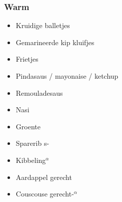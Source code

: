 \subsubsection*{Warm}
\begin{itemize}
	\item	Kruidige balletjes
	\item	Gemarineerde kip kluifjes
	\item	Frietjes
	\item	Pindasaus / mayonaise / ketchup
	\item	Remouladesaus
	\item	Nasi
	\item	Groente
	\item	Sparerib s- 
	\item	Kibbeling$^{\alpha}$
	\item	Aardappel gerecht
	\item	Couscouse gerecht-$^{\alpha}$
	
\end{itemize}
